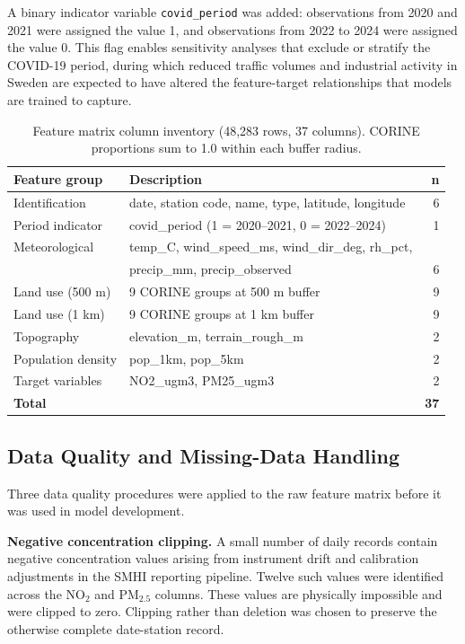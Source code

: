 \documentclass[11pt,a4paper]{article}
\let\oldsubsection\subsection
\renewcommand{\subsection}{\FloatBarrier\oldsubsection}
\begin{document}
A binary indicator variable \texttt{covid\_period} was added: observations from 2020 and 2021 were assigned the value 1, and observations from 2022 to 2024 were assigned the value 0. This flag enables sensitivity analyses that exclude or stratify the COVID-19 period, during which reduced traffic volumes and industrial activity in Sweden are expected to have altered the feature-target relationships that models are trained to capture.

\begin{table}[ht]
\caption{Feature matrix column inventory (48,283 rows, 37 columns). CORINE proportions sum to 1.0 within each buffer radius.}
\label{tab:feature-matrix}
\small
\begin{tabular}{llr}
\hline
\textbf{Feature group} & \textbf{Description} & \textbf{n} \\
\hline
Identification & date, station code, name, type, latitude, longitude & 6 \\
Period indicator & covid\_period (1 = 2020--2021, 0 = 2022--2024) & 1 \\
Meteorological & temp\_C, wind\_speed\_ms, wind\_dir\_deg, rh\_pct, & \\
 & precip\_mm, precip\_observed & 6 \\
Land use (500 m) & 9 CORINE groups at 500 m buffer & 9 \\
Land use (1 km) & 9 CORINE groups at 1 km buffer & 9 \\
Topography & elevation\_m, terrain\_rough\_m & 2 \\
Population density & pop\_1km, pop\_5km & 2 \\
Target variables & NO2\_ugm3, PM25\_ugm3 & 2 \\
\hline
\textbf{Total} & & \textbf{37} \\
\hline
\end{tabular}
\end{table}

\subsection{Data Quality and Missing-Data Handling}
\label{sec:data-quality}

Three data quality procedures were applied to the raw feature matrix before it was used in model development.

\textbf{Negative concentration clipping.} A small number of daily records contain negative concentration values arising from instrument drift and calibration adjustments in the SMHI reporting pipeline. Twelve such values were identified across the NO$_2$ and PM$_{2.5}$ columns. These values are physically impossible and were clipped to zero. Clipping rather than deletion was chosen to preserve the otherwise complete date-station record.
\end{document}
